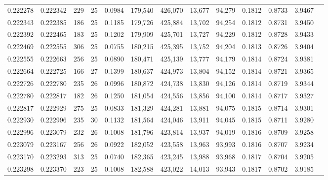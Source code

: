 \begin{tabular}{rrrrrrrrrrrrr}
0.222278 & 0.222342 &   229 &  25 &                                     0.0984 & 179,540 & 426,070 &  13,677 &  94,279 & 0.1812 & 0.8733 & 3.9467 \\
0.222343 & 0.222385 &   186 &  25 &                                     0.1185 & 179,726 & 425,884 &  13,702 &  94,254 & 0.1812 & 0.8731 & 3.9450 \\
0.222392 & 0.222465 &   183 &  25 &                                     0.1202 & 179,909 & 425,701 &  13,727 &  94,229 & 0.1812 & 0.8728 & 3.9433 \\
0.222469 & 0.222555 &   306 &  25 &                                     0.0755 & 180,215 & 425,395 &  13,752 &  94,204 & 0.1813 & 0.8726 & 3.9404 \\
0.222555 & 0.222663 &   256 &  25 &                                     0.0890 & 180,471 & 425,139 &  13,777 &  94,179 & 0.1814 & 0.8724 & 3.9381 \\
0.222664 & 0.222725 &   166 &  27 &                                     0.1399 & 180,637 & 424,973 &  13,804 &  94,152 & 0.1814 & 0.8721 & 3.9365 \\
0.222726 & 0.222780 &   235 &  26 &                                     0.0996 & 180,872 & 424,738 &  13,830 &  94,126 & 0.1814 & 0.8719 & 3.9344 \\
0.222780 & 0.222817 &   182 &  26 &                                     0.1250 & 181,054 & 424,556 &  13,856 &  94,100 & 0.1814 & 0.8717 & 3.9327 \\
0.222817 & 0.222929 &   275 &  25 &                                     0.0833 & 181,329 & 424,281 &  13,881 &  94,075 & 0.1815 & 0.8714 & 3.9301 \\
0.222930 & 0.222996 &   235 &  30 &                                     0.1132 & 181,564 & 424,046 &  13,911 &  94,045 & 0.1815 & 0.8711 & 3.9280 \\
0.222996 & 0.223079 &   232 &  26 &                                     0.1008 & 181,796 & 423,814 &  13,937 &  94,019 & 0.1816 & 0.8709 & 3.9258 \\
0.223079 & 0.223167 &   256 &  26 &                                     0.0922 & 182,052 & 423,558 &  13,963 &  93,993 & 0.1816 & 0.8707 & 3.9234 \\
0.223170 & 0.223293 &   313 &  25 &                                     0.0740 & 182,365 & 423,245 &  13,988 &  93,968 & 0.1817 & 0.8704 & 3.9205 \\
0.223298 & 0.223370 &   223 &  25 &                                     0.1008 & 182,588 & 423,022 &  14,013 &  93,943 & 0.1817 & 0.8702 & 3.9185 \\

\end{tabular}
